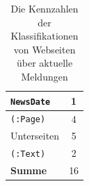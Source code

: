 \begin{table}[htb]
\begin{subtable}[c]{0.5\textwidth}
\begin{tabular}{|l|c|}
                \texttt{NewsDate}        & 1                                    \\ \hline
                \texttt{(:Page)}          & 4                                    \\ \hline
                Unterseiten     & 5                                    \\ \hline
                \texttt{(:Text)}           & 2                                    \\ \hline
                \textbf{Summe}  & 16                                   \\ \hline
                \end{tabular}
            \label{table:findingsNewsFiguresSharedNodes}
        \end{subtable}
        \label{table:findingsNewsFigures}
        \caption{Die Kennzahlen der Klassifikationen von Webseiten über aktuelle Meldungen}
    \end{table}